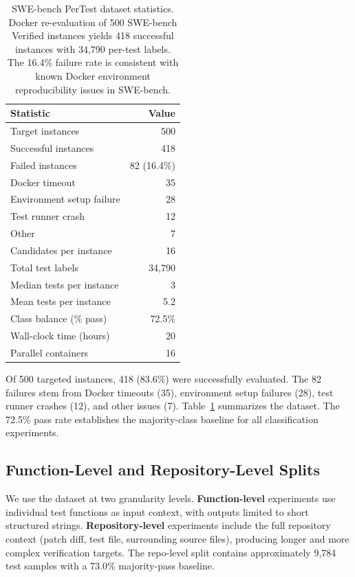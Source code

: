 \documentclass[11pt]{article}
\begin{document}
\begin{table}[t]
\centering
\small
\begin{tabular}{lr}
\toprule
\textbf{Statistic} & \textbf{Value} \\
\midrule
Target instances & 500 \\
Successful instances & 418 \\
Failed instances & 82 (16.4\%) \\
\quad Docker timeout & 35 \\
\quad Environment setup failure & 28 \\
\quad Test runner crash & 12 \\
\quad Other & 7 \\
\midrule
Candidates per instance & 16 \\
Total test labels & 34,790 \\
Median tests per instance & 3 \\
Mean tests per instance & 5.2 \\
Class balance (\% pass) & 72.5\% \\
\midrule
Wall-clock time (hours) & 20 \\
Parallel containers & 16 \\
\bottomrule
\end{tabular}
\caption{SWE-bench PerTest dataset statistics. Docker re-evaluation of 500 SWE-bench Verified instances yields 418 successful instances with 34,790 per-test labels. The 16.4\% failure rate is consistent with known Docker environment reproducibility issues in SWE-bench.}
\label{tab:dataset}
\end{table}

Of 500 targeted instances, 418 (83.6\%) were successfully evaluated. The 82 failures stem from Docker timeouts (35), environment setup failures (28), test runner crashes (12), and other issues (7). Table~\ref{tab:dataset} summarizes the dataset. The 72.5\% pass rate establishes the majority-class baseline for all classification experiments.

\subsection{Function-Level and Repository-Level Splits}

We use the dataset at two granularity levels. \textbf{Function-level} experiments use individual test functions as input context, with outputs limited to short structured strings. \textbf{Repository-level} experiments include the full repository context (patch diff, test file, surrounding source files), producing longer and more complex verification targets. The repo-level split contains approximately 9,784 test samples with a 73.0\% majority-pass baseline.
\end{document}
